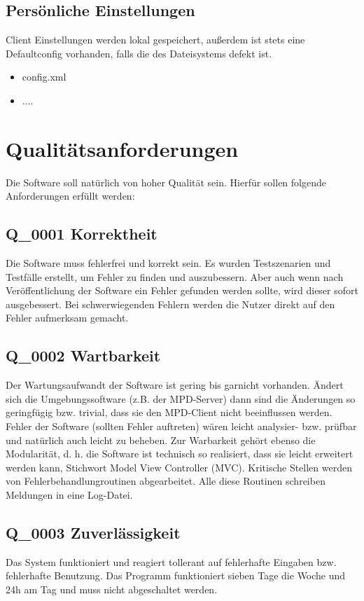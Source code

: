 \subsection{Persönliche Einstellungen}
Client Einstellungen werden lokal gespeichert, außerdem ist stets eine Defaultconfig vorhanden, falls die des Dateisystems defekt ist.
\begin{itemize}
	\item config.xml
	\item ....
\end{itemize}
\section{Qualitätsanforderungen}
Die Software soll natürlich von hoher Qualität sein. Hierfür sollen folgende
Anforderungen erfüllt werden:
\subsection{Q\_0001 Korrektheit}
Die Software muss fehlerfrei und korrekt sein. Es wurden Testszenarien und Testfälle erstellt,
um Fehler zu finden und auszubessern. Aber auch wenn nach Veröffentlichung der Software ein 
Fehler gefunden werden sollte, wird dieser sofort ausgebessert. Bei schwerwiegenden Fehlern
werden die Nutzer direkt auf den Fehler aufmerksam gemacht.
\subsection{Q\_0002 Wartbarkeit}
Der Wartungsaufwandt der Software ist gering bis garnicht vorhanden. Ändert sich die Umgebungssoftware
(z.B. der MPD-Server) dann sind die Änderungen so geringfügig bzw. trivial, dass sie den MPD-Client 
nicht beeinflussen werden. Fehler der Software (sollten Fehler auftreten) wären leicht analysier- bzw.
prüfbar und natürlich auch leicht zu beheben. Zur Warbarkeit gehört ebenso die Modularität, d. h.
die Software ist technisch so realisiert, dass sie leicht erweitert werden kann, Stichwort Model View
Controller (MVC). Kritische Stellen werden von Fehlerbehandlungroutinen abgearbeitet.
Alle diese Routinen schreiben Meldungen in eine Log-Datei.
\subsection{Q\_0003 Zuverlässigkeit}
Das System funktioniert und reagiert tollerant auf fehlerhafte Eingaben bzw. fehlerhafte Benutzung.
Das Programm funktioniert sieben Tage die Woche und 24h am Tag und muss nicht abgeschaltet werden.
